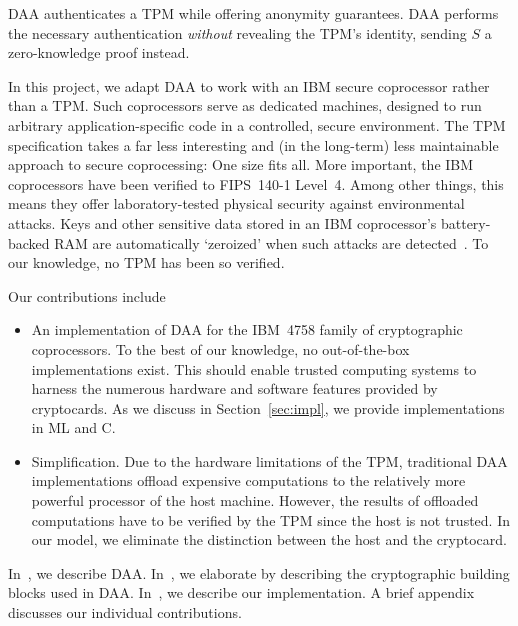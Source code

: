 DAA authenticates a TPM
while offering anonymity guarantees.
DAA performs the necessary authentication \emph{without} revealing the TPM's identity,
sending $S$ a zero-knowledge proof instead.

In this project, we adapt DAA to work with an IBM secure coprocessor
rather than a TPM.
Such coprocessors serve as dedicated machines, 
designed to run arbitrary application-specific
code in a controlled, secure environment.
The TPM specification takes a far less
interesting and (in the long-term) less maintainable approach to
secure coprocessing: One size fits all.
More important, the IBM coprocessors have been verified to FIPS~140-1 Level~4.
Among other things, this means they offer laboratory-tested physical security against
environmental attacks.
Keys and other sensitive data stored in an IBM coprocessor's battery-backed RAM
are automatically `zeroized' when such attacks are detected~\cite{smith:fips}.
To our knowledge, no TPM has been so verified.

Our contributions include
\begin{itemize}
\item An implementation of DAA for the IBM~4758 family of cryptographic coprocessors.
To the best of our knowledge, no out-of-the-box implementations exist.
This should enable trusted computing systems to harness the numerous hardware and software features provided by cryptocards.
As we discuss in Section~\ref{sec:impl}, we provide implementations in ML and C.

\item Simplification.
Due to the hardware limitations of the TPM, traditional DAA implementations offload expensive computations to the relatively more powerful processor of the host machine.
However, the results of offloaded computations have to be verified by the TPM since the host is not trusted.
In our model, we eliminate the distinction between the host and the cryptocard. 
\end{itemize}

In~, we describe DAA.
In~, we elaborate by describing the
cryptographic building blocks used in DAA.
In~, we describe our implementation.
A brief appendix discusses our individual contributions.
